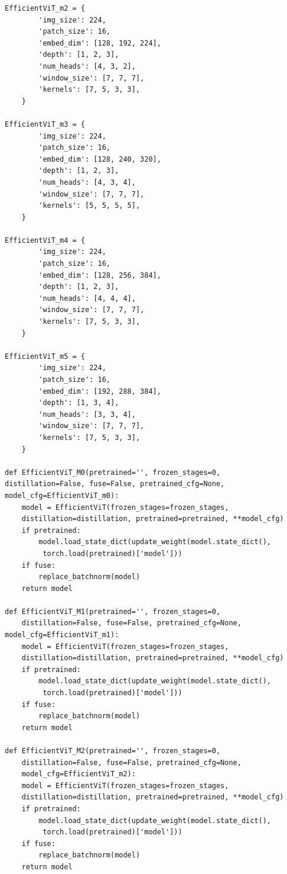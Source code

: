 \documentclass[12pt]{ctexart}
\begin{document}
\begin{lstlisting}
EfficientViT_m2 = {
        'img_size': 224,
        'patch_size': 16,
        'embed_dim': [128, 192, 224],
        'depth': [1, 2, 3],
        'num_heads': [4, 3, 2],
        'window_size': [7, 7, 7],
        'kernels': [7, 5, 3, 3],
    }
 
EfficientViT_m3 = {
        'img_size': 224,
        'patch_size': 16,
        'embed_dim': [128, 240, 320],
        'depth': [1, 2, 3],
        'num_heads': [4, 3, 4],
        'window_size': [7, 7, 7],
        'kernels': [5, 5, 5, 5],
    }
 
EfficientViT_m4 = {
        'img_size': 224,
        'patch_size': 16,
        'embed_dim': [128, 256, 384],
        'depth': [1, 2, 3],
        'num_heads': [4, 4, 4],
        'window_size': [7, 7, 7],
        'kernels': [7, 5, 3, 3],
    }
 
EfficientViT_m5 = {
        'img_size': 224,
        'patch_size': 16,
        'embed_dim': [192, 288, 384],
        'depth': [1, 3, 4],
        'num_heads': [3, 3, 4],
        'window_size': [7, 7, 7],
        'kernels': [7, 5, 3, 3],
    }
 
def EfficientViT_M0(pretrained='', frozen_stages=0, 
distillation=False, fuse=False, pretrained_cfg=None, model_cfg=EfficientViT_m0):
    model = EfficientViT(frozen_stages=frozen_stages, 
    distillation=distillation, pretrained=pretrained, **model_cfg)
    if pretrained:
        model.load_state_dict(update_weight(model.state_dict(),
         torch.load(pretrained)['model']))
    if fuse:
        replace_batchnorm(model)
    return model
 
def EfficientViT_M1(pretrained='', frozen_stages=0, 
    distillation=False, fuse=False, pretrained_cfg=None, model_cfg=EfficientViT_m1):
    model = EfficientViT(frozen_stages=frozen_stages, 
    distillation=distillation, pretrained=pretrained, **model_cfg)
    if pretrained:
        model.load_state_dict(update_weight(model.state_dict(),
         torch.load(pretrained)['model']))
    if fuse:
        replace_batchnorm(model)
    return model
 
def EfficientViT_M2(pretrained='', frozen_stages=0, 
    distillation=False, fuse=False, pretrained_cfg=None, 
    model_cfg=EfficientViT_m2):
    model = EfficientViT(frozen_stages=frozen_stages, 
    distillation=distillation, pretrained=pretrained, **model_cfg)
    if pretrained:
        model.load_state_dict(update_weight(model.state_dict(),
         torch.load(pretrained)['model']))
    if fuse:
        replace_batchnorm(model)
    return model
 

\end{lstlisting}
\end{document}
